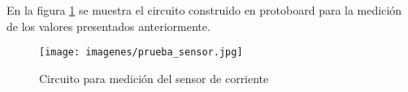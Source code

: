     En la figura \ref{fig:mediciones_sensor} se muestra el circuito construido
    en protoboard para la medición de los valores presentados anteriormente.

    \begin{figure}[H]
        \centering
        \texttt{[image: imagenes/prueba\_sensor.jpg]}
        \caption{Circuito para medición del sensor de corriente}
        \label{fig:mediciones_sensor}
    \end{figure}
